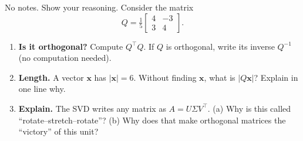 \documentclass[10pt]{article}
\newcommand{\xx}{\mathbf{x}}
\newcommand{\T}{^{\top}}
\begin{document}
\namedateperiod

\vspace{0.15in}

No notes. Show your reasoning. Consider the matrix
\[
  Q=\tfrac15\begin{bmatrix} 4 & -3\\ 3 & 4 \end{bmatrix}.
\]

\begin{enumerate}[leftmargin=1.8em, itemsep=15pt]
  \item \textbf{Is it orthogonal?} Compute $Q\T Q$. If $Q$ is orthogonal, write its inverse $Q^{-1}$ (no computation needed).
        \vspace{2.0cm}
  \item \textbf{Length.} A vector $\xx$ has $|\xx|=6$. Without finding $\xx$, what is $|Q\xx|$? Explain in one line why.
        \vspace{1.8cm}
  \item \textbf{Explain.} The SVD writes any matrix as $A=U\Sigma V\T$. (a) Why is this called ``rotate--stretch--rotate''? (b) Why does that make orthogonal matrices the ``victory'' of this unit? 
\end{enumerate}
\end{document}
